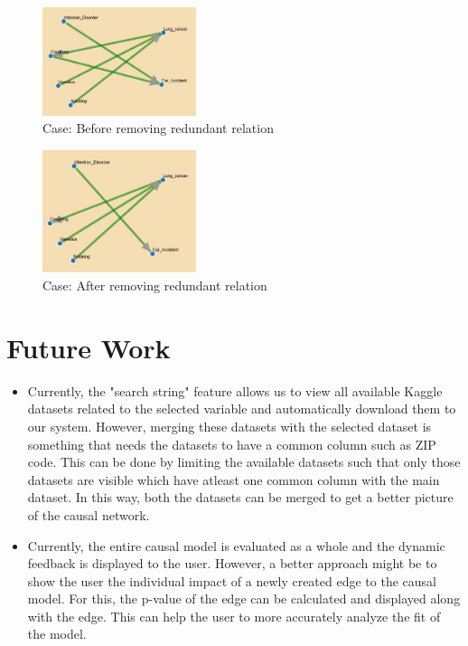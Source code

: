 \documentclass{vgtc}                          %
\begin{document}
\begin{itemize}
    \begin{figure}[H]
      \caption{Case: Before removing redundant relation}
      \centering
      \includegraphics[width=0.4\textwidth]{c6_1}
    \end{figure}
    
    \begin{figure}[H]
      \caption{Case: After removing redundant relation}
      \centering
      \includegraphics[width=0.4\textwidth]{c6_2}
    \end{figure}
\end{itemize}


\section{Future Work}

\begin{itemize}
\item Currently, the "search string" feature allows us to view all available Kaggle datasets related to the selected variable and automatically download them to our system. However, merging these datasets with the selected dataset is something that needs the datasets to have a common column such as ZIP code. This can be done by limiting the available datasets such that only those datasets are visible which have atleast one common column with the main dataset. In this way, both the datasets can be merged to get a better picture of the causal network.
\item Currently, the entire causal model is evaluated as a whole and the dynamic feedback is displayed to the user. However, a better approach might be to show the user the individual impact of a newly created edge to the causal model. For this, the p-value of the edge can be calculated and displayed along with the edge. This can help the user to more accurately analyze the fit of the model.
\end{itemize}
\end{document}
